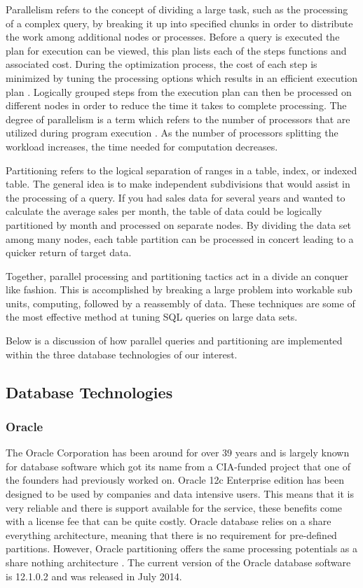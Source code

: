 \documentclass[draftclsnofoot, onecolumn, compsoc, 10pt]{IEEEtran}
\begin{document}
Parallelism refers to the concept of dividing a large task, such as the processing of a complex query, by breaking it up into specified chunks in order to distribute the work among additional nodes or processes.
Before a query is executed the plan for execution can be viewed, this plan lists each of the steps functions and associated cost.
During the optimization process, the cost of each step is minimized by tuning the processing options which results in an efficient execution plan \cite{Optimizer Concepts}.
Logically grouped steps from the execution plan can then be processed on different nodes in order to reduce the time it takes to complete processing.
The degree of parallelism is a term which refers to the number of processors that are utilized during program execution  \cite{Query Optimization In Relational Systems}.
As the number of processors splitting the workload increases, the time needed for computation decreases.

Partitioning refers to the logical separation of ranges in a table, index, or indexed table.
The general idea is to make independent subdivisions that would assist in the processing of a query.
If you had sales data for several years and wanted to calculate the average sales per month, the table of data could be logically partitioned by month and processed on separate nodes.
By dividing the data set among many nodes, each table partition can be processed in concert leading to a quicker return of target data.

Together, parallel processing and partitioning tactics act in a divide an conquer like fashion. This is accomplished by breaking a large problem into workable sub units, computing, followed by a reassembly of data. These techniques are some of the most effective method at tuning SQL queries on large data sets. 

Below is a discussion of how parallel queries and partitioning are implemented within the three database technologies of our interest.

\subsection{Database Technologies}

\subsubsection{Oracle}
The Oracle Corporation has been around for over 39 years and is largely known for database software which got its name from a CIA-funded project that one of the founders had previously worked on.
Oracle 12c Enterprise edition has been designed to be used by companies and data intensive users.
This means that it is very reliable and there is support available for the service, these benefits come with a license fee that can be quite costly.
Oracle database relies on a share everything architecture, meaning that there is no requirement for pre-defined partitions. However, Oracle partitioning offers the same processing potentials as a share nothing architecture \cite{How Parallel Execution Works}.
The current version of the Oracle database software is 12.1.0.2 and was released in July 2014.
\end{document}
